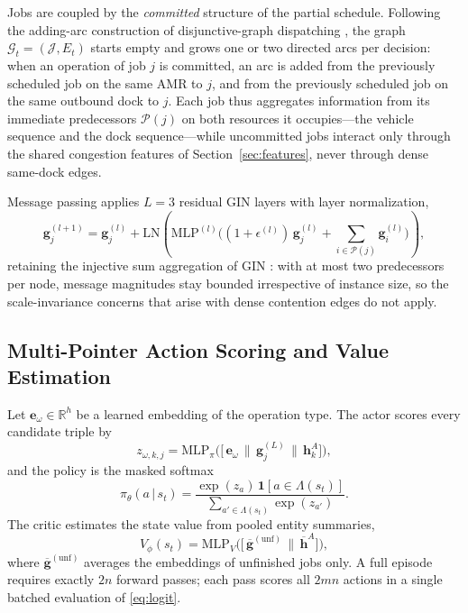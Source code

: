 Jobs are coupled by the \emph{committed} structure of the partial
schedule. Following the adding-arc construction of disjunctive-graph
dispatching \cite{zhang2020l2d}, the graph
$\mathcal{G}_t=(\mathcal{J},E_t)$ starts empty and grows one or two
directed arcs per decision: when an operation of job $j$ is committed,
an arc is added from the previously scheduled job on the same AMR to
$j$, and from the previously scheduled job on the same outbound dock to
$j$. Each job thus aggregates information from its immediate
predecessors $\mathcal{P}(j)$ on both resources it occupies---the
vehicle sequence and the dock sequence---while uncommitted jobs
interact only through the shared congestion features of
Section~\ref{sec:features}, never through dense same-dock edges.

Message passing applies $L=3$ residual GIN layers with layer
normalization,
\begin{equation}
\bm{g}^{(l+1)}_j=\bm{g}^{(l)}_j+
\mathrm{LN}\!\left(\mathrm{MLP}^{(l)}\!\Big(
(1{+}\epsilon^{(l)})\,\bm{g}^{(l)}_j+
\sum_{i\in\mathcal{P}(j)}\!\bm{g}^{(l)}_i
\Big)\right)\!,
\label{eq:gin}
\end{equation}
retaining the injective sum aggregation of GIN \cite{xu2019gin}: with
at most two predecessors per node, message magnitudes stay bounded
irrespective of instance size, so the scale-invariance concerns that
arise with dense contention edges do not apply.

\subsection{Multi-Pointer Action Scoring and Value Estimation}
\label{sec:actor}

Let $\bm{e}_{\omega}\in\mathbb{R}^{h}$ be a learned embedding of the
operation type. The actor scores every candidate triple by
\begin{equation}
z_{\omega,k,j}=\mathrm{MLP}_{\pi}\!\big(\big[\,\bm{e}_{\omega}\,\|\,
\bm{g}^{(L)}_{j}\,\|\,\bm{h}^{A}_{k}\big]\big),
\label{eq:logit}
\end{equation}
and the policy is the masked softmax
\begin{equation}
\pi_{\theta}(a\,|\,s_t)=
\frac{\exp(z_{a})\,\mathbf{1}[a\in\Lambda(s_t)]}
{\sum_{a'\in\Lambda(s_t)}\exp(z_{a'})}.
\label{eq:policy}
\end{equation}
The critic estimates the state value from pooled entity summaries,
\begin{equation}
V_{\phi}(s_t)=\mathrm{MLP}_{V}\!\big(\big[\,
\overline{\bm{g}}^{\mathrm{(unf)}} \,\|\, \overline{\bm{h}}^{A}\big]\big),
\label{eq:critic}
\end{equation}
where $\overline{\bm{g}}^{\mathrm{(unf)}}$ averages the embeddings of
unfinished jobs only. A full episode requires exactly $2n$ forward
passes; each pass scores all $2mn$ actions in a single batched
evaluation of \eqref{eq:logit}.

